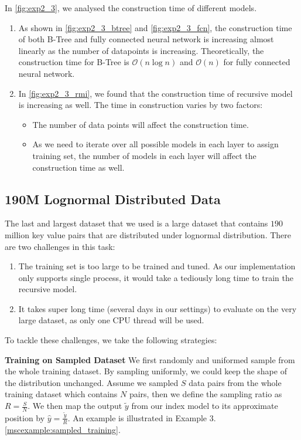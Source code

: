 \begin{mscconclusion}
	In \ref{fig:exp2_3}, we analysed the construction time of different models.
	\begin{enumerate}
		\item As shown in \ref{fig:exp2_3_btree} and \ref{fig:exp2_3_fcn}, the construction time of both B-Tree and fully connected neural network is increasing almost linearly as the number of datapoints is increasing. Theoretically, the construction time for B-Tree is $\mathcal{O}(n\log n)$ and $\mathcal{O}(n)$ for fully connected neural network.
		\item In \ref{fig:exp2_3_rmi}, we found that the construction time of recursive model is increasing as well. The time in construction varies by two factors:
			\begin{itemize}
				\item The number of data points will affect the construction time.
				\item As we need to iterate over all possible models in each layer to assign training set, the number of models in each layer will affect the construction time as well.
			\end{itemize}
	\end{enumerate}
\end{mscconclusion}

\subsection{190M Lognormal Distributed Data} The last and largest dataset that we used is a large dataset that contains $190$ million key value pairs that are distributed under lognormal distribution. There are two challenges in this task:

\begin{enumerate}
	\item The training set is too large to be trained and tuned. As our implementation only supports single process, it would take a tediously long time to train the recursive model.
	\item It takes super long time (several days in our settings) to evaluate on the very large dataset, as only one CPU thread will be used.
\end{enumerate}

To tackle these challenges, we take the following strategies:

\textbf{Training on Sampled Dataset} We first randomly and uniformed sample from the whole training dataset. By sampling uniformly, we could keep the shape of the distribution unchanged. Assume we sampled $S$ data pairs from the whole training dataset which contains $N$ pairs, then we define the sampling ratio as $R=\frac{S}{N}$. We then map the output $\tilde{y}$ from our index model to its approximate position by $\hat{y}=\frac{\tilde{y}}{R}$. An example is illustrated in Example 3.\ref{mscexample:sampled_training}.

